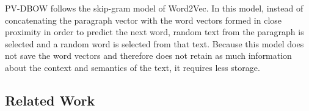 PV-DBOW follows the skip-gram model of Word2Vec. In this model, instead of concatenating the paragraph vector with the word vectors formed in close proximity in order to predict the next word, random text from the paragraph is selected and a random word is selected from that text. Because this model does not save the word vectors and therefore does not retain as much information about the context and semantics of the text, it requires less storage.


\subsection{Related Work}
